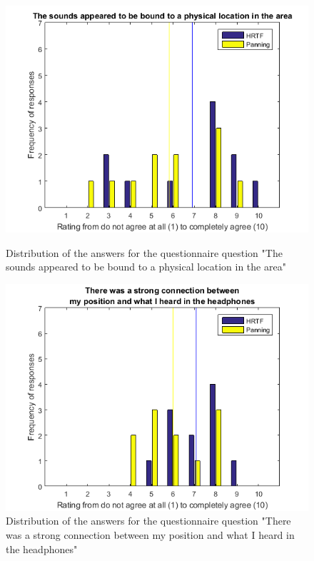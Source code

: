 \documentclass[journal]{IEEEtran}
\begin{document}
\begin{appendices}
\begin{figure}[h!]
  \centering
    \includegraphics[scale=0.6]{graphics/qq2.png}
   \caption{Distribution of the answers for the questionnaire question "The sounds appeared to be bound to a physical location in the area"}
  \label{fig:plt8}
      \includegraphics[scale=0.6]{graphics/qq3.png}
   \caption{Distribution of the answers for the questionnaire question "There was a strong connection between my position and what I heard in the headphones"}
  \label{fig:plt9}
\end{figure}


\end{appendices}
\end{document}
